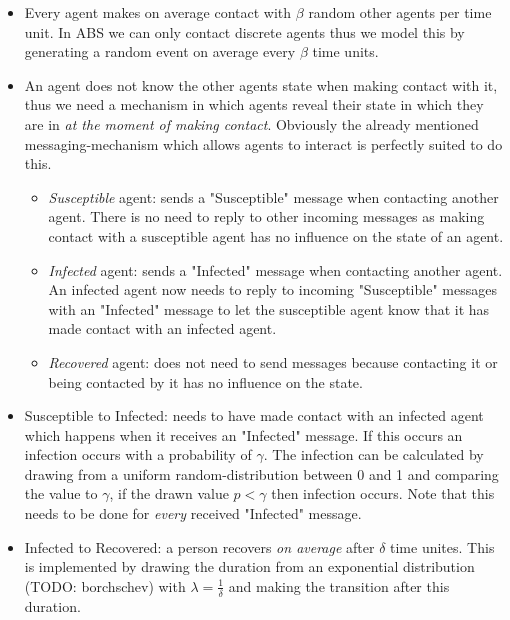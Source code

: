 \begin{itemize}
	\item Every agent makes on average contact with $\beta$ random other agents per time unit. In ABS we can only contact discrete agents thus we model this by generating a random event on average every $\beta$ time units.
	
	\item An agent does not know the other agents state when making contact with it, thus we need a mechanism in which agents reveal their state in which they are in \textit{at the moment of making contact}. Obviously the already mentioned messaging-mechanism which allows agents to interact is perfectly suited to do this.
	\begin{itemize}
		\item \textit{Susceptible} agent: sends a "Susceptible" message when contacting another agent. There is no need to reply to other incoming messages as making contact with a susceptible agent has no influence on the state of an agent.
		\item \textit{Infected} agent: sends a "Infected" message when contacting another agent. An infected agent now needs to reply to incoming "Susceptible" messages with an "Infected" message to let the susceptible agent know that it has made contact with an infected agent.
		\item \textit{Recovered} agent: does not need to send messages because contacting it or being contacted by it has no influence on the state.
	\end{itemize}
	
	\item Susceptible to Infected: needs to have made contact with an infected agent which happens when it receives an "Infected" message. If this occurs an infection occurs with a probability of $\gamma$. The infection can be calculated by drawing from a uniform random-distribution between 0 and 1 and comparing the value to $\gamma$, if the drawn value $p < \gamma$ then infection occurs. Note that this needs to be done for \textit{every} received "Infected" message.
	
	\item Infected to Recovered: a person recovers \textit{on average} after $\delta$ time unites. This is implemented by drawing the duration from an exponential distribution (TODO: borchschev) with $\lambda = \frac{1}{\delta}$ and making the transition after this duration.
\end{itemize}

